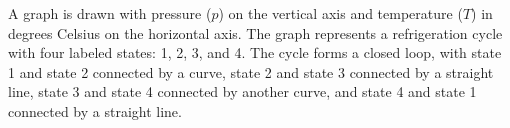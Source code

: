 A graph is drawn with pressure (\( p \)) on the vertical axis and temperature (\( T \)) in degrees Celsius on the horizontal axis. The graph represents a refrigeration cycle with four labeled states: 1, 2, 3, and 4. The cycle forms a closed loop, with state 1 and state 2 connected by a curve, state 2 and state 3 connected by a straight line, state 3 and state 4 connected by another curve, and state 4 and state 1 connected by a straight line.